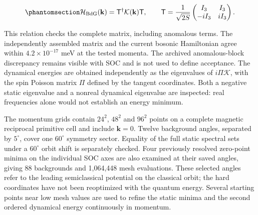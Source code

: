 \begin{equation}\phantomsection\label{eq-nbcp-y-tangent-bdg-check}{
\mathcal H_{\rm BdG}(\mathbf k)
=\mathsf T^\dagger\mathcal K(\mathbf k)\mathsf T,
\qquad
\mathsf T=\frac{1}{\sqrt{2S}}
\begin{pmatrix} I_3&I_3\\-iI_3&iI_3\end{pmatrix}.
}\end{equation}

This relation checks the complete matrix, including anomalous terms. The
independently assembled matrix and the current bosonic Hamiltonian agree
within \(4.2\times10^{-17}\) meV at the tested momenta. The archived
anomalous-block discrepancy remains visible with SOC and is not used to
define acceptance. The dynamical energies are obtained independently as
the eigenvalues of \(i\Pi\mathcal K\), with the spin Poisson matrix
\(\Pi\) defined by the tangent coordinates. Both a negative static
eigenvalue and a nonreal dynamical eigenvalue are inspected: real
frequencies alone would not establish an energy minimum.

The momentum grids contain \(24^2\), \(48^2\) and \(96^2\) points on a
complete magnetic reciprocal primitive cell and include \(\mathbf k=0\).
Twelve background angles, separated by \(5^\circ\), cover one
\(60^\circ\) symmetry sector. Equality of the full static spectral sets
under a \(60^\circ\) orbit shift is separately checked. Four previously
resolved zero-point minima on the individual SOC axes are also examined
at their saved angles, giving 88 backgrounds and 1,064,448 mesh
evaluations. These selected angles refer to the leading semiclassical
potential on the classical orbit; the hard coordinates have not been
reoptimized with the quantum energy. Several starting points near low
mesh values are used to refine the static minima and the second ordered
dynamical energy continuously in momentum.

